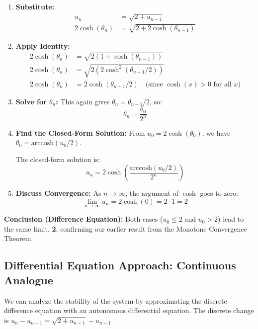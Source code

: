 \documentclass[12pt,a4paper]{article}
\theoremstyle{definition}
\begin{document}
\begin{enumerate}[label=\arabic*.]
    \item \textbf{Substitute:}
    \begin{align*}
    u_n &= \sqrt{2 + u_{n-1}}\\
    2\cosh(\theta_n) &= \sqrt{2 + 2\cosh(\theta_{n-1})}
    \end{align*}
    
    \item \textbf{Apply Identity:}
    \begin{align*}
    2\cosh(\theta_n) &= \sqrt{2(1 + \cosh(\theta_{n-1}))}\\
    2\cosh(\theta_n) &= \sqrt{2(2\cosh^2(\theta_{n-1}/2))}\\
    2\cosh(\theta_n) &= 2\cosh(\theta_{n-1}/2) \quad \text{(since $\cosh(x) > 0$ for all $x$)}
    \end{align*}
    
    \item \textbf{Solve for $\theta_n$:}
    This again gives $\theta_n = \theta_{n-1}/2$, so:
    \[
    \theta_n = \frac{\theta_0}{2^n}
    \]
    
    \item \textbf{Find the Closed-Form Solution:}
    From $u_0 = 2\cosh(\theta_0)$, we have $\theta_0 = \text{arccosh}(u_0/2)$.
    
    The closed-form solution is:
    \[
    u_n = 2\cosh\left(\frac{\text{arccosh}(u_0/2)}{2^n}\right)
    \]
    
    \item \textbf{Discuss Convergence:}
    As $n \to \infty$, the argument of $\cosh$ goes to zero:
    \[
    \lim_{n \to \infty} u_n = 2\cosh(0) = 2 \cdot 1 = 2
    \]
\end{enumerate}

\textbf{Conclusion (Difference Equation):} Both cases ($u_0 \le 2$ and $u_0 > 2$) lead to the same limit, \textbf{2}, confirming our earlier result from the Monotone Convergence Theorem.

\subsection{Differential Equation Approach: Continuous Analogue}

We can analyze the stability of the system by approximating the discrete difference equation with an autonomous differential equation. The discrete change is $u_n - u_{n-1} = \sqrt{2 + u_{n-1}} - u_{n-1}$.
\end{document}
